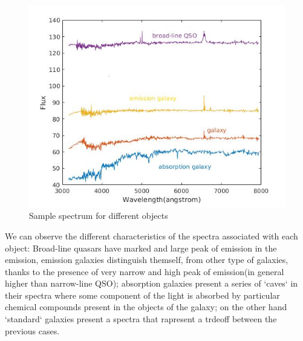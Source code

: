 \documentclass[a4paper,10pt]{article}
\begin{document}
    \begin{figure}[H]
      \caption{Sample spectrum for different objects}
      \centering
      \includegraphics[scale=0.6]{sample_spec.jpg}
    \end{figure}
    
    We can observe the different characteristics of the spectra associated with each object:\newline
    Broad-line quasars have marked and large peak of emission in the emission, emission galaxies distinguish themself, from other type
    of galaxies, thanks to the presence of very narrow and high peak of emission(in general higher than narrow-line QSO); absorption 
    galaxies present a series of `caves` in their spectra where some component of the light is absorbed by particular chemical compounds present in 
    the objects of the galaxy; on the other hand `standard` galaxies present a spectra that rapresent a trdeoff between the previous cases.\newline\newline
    
\end{document}
